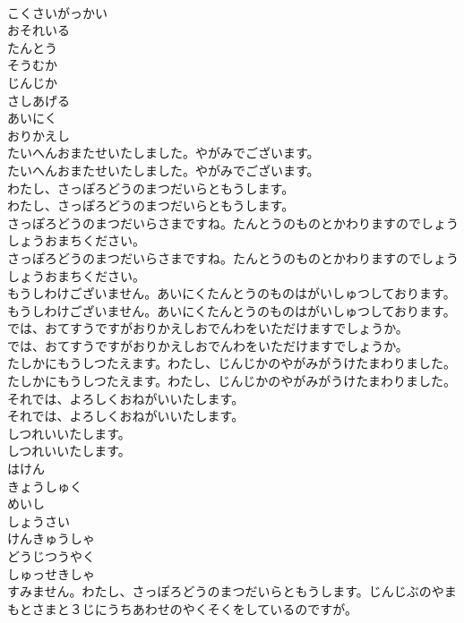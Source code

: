 \documentclass[8pt]{extreport}
\begin{document}
\begin{CJK}{UTF8}{min}
\\	こくさいがっかい
\\	おそれいる
\\	たんとう
\\	そうむか
\\	じんじか
\\	さしあげる
\\	あいにく
\\	おりかえし
\\	たいへんおまたせいたしました。やがみでございます。
\\	たいへんおまたせいたしました。やがみでございます。
\\	わたし、さっぽろどうのまつだいらともうします。
\\	わたし、さっぽろどうのまつだいらともうします。
\\	さっぽろどうのまつだいらさまですね。たんとうのものとかわりますのでしょうしょうおまちください。
\\	さっぽろどうのまつだいらさまですね。たんとうのものとかわりますのでしょうしょうおまちください。
\\	もうしわけございません。あいにくたんとうのものはがいしゅつしております。
\\	もうしわけございません。あいにくたんとうのものはがいしゅつしております。
\\	では、おてすうですがおりかえしおでんわをいただけますでしょうか。
\\	では、おてすうですがおりかえしおでんわをいただけますでしょうか。
\\	たしかにもうしつたえます。わたし、じんじかのやがみがうけたまわりました。
\\	たしかにもうしつたえます。わたし、じんじかのやがみがうけたまわりました。
\\	それでは、よろしくおねがいいたします。
\\	それでは、よろしくおねがいいたします。
\\	しつれいいたします。
\\	しつれいいたします。
\\	はけん
\\	きょうしゅく
\\	めいし
\\	しょうさい
\\	けんきゅうしゃ
\\	どうじつうやく
\\	しゅっせきしゃ
\\	すみません。わたし、さっぽろどうのまつだいらともうします。じんじぶのやまもとさまと３じにうちあわせのやくそくをしているのですが。

\end{CJK}
\end{document}

